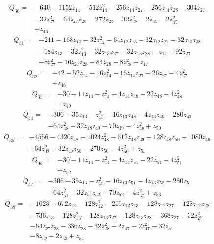 \[\begin{aligned}Q_{30}={}&-640-1152z_{14}-512z_{14}^{2}-256z_{14}z_{27}-256z_{14}z_{28}-304z_{27}
\\&-32z_{27}^{2}-64z_{27}z_{28}-272z_{28}-32z_{28}^{2}-2z_{45}-2z_{45}^{2}
\\&+z_{46}
\end{aligned}\]
\[\begin{aligned}Q_{31}={}&-241-168z_{12}-32z_{12}^{2}-64z_{12}z_{13}-32z_{12}z_{27}-32z_{12}z_{28}
\\&-184z_{13}-32z_{13}^{2}-32z_{13}z_{27}-32z_{13}z_{28}-z_{14}-92z_{27}
\\&-8z_{27}^{2}-16z_{27}z_{28}-84z_{28}-8z_{28}^{2}+z_{47}
\end{aligned}\]
\[\begin{aligned}Q_{32}={}&-42-52z_{14}-16z_{14}^{2}-16z_{14}z_{27}-26z_{27}-4z_{27}^{2}
\\&+z_{48}
\end{aligned}\]
\[\begin{aligned}Q_{33}={}&-30-11z_{14}-z_{14}^{2}-4z_{14}z_{48}-22z_{48}-4z_{48}^{2}
\\&+z_{49}
\end{aligned}\]
\[\begin{aligned}Q_{34}={}&-306-35z_{13}-z_{13}^{2}-16z_{13}z_{48}-4z_{13}z_{49}-280z_{48}
\\&-64z_{48}^{2}-32z_{48}z_{49}-70z_{49}-4z_{49}^{2}+z_{50}
\end{aligned}\]
\[\begin{aligned}Q_{35}={}&-4556-4320z_{48}-1024z_{48}^{2}-512z_{48}z_{49}-128z_{48}z_{50}-1080z_{49}
\\&-64z_{49}^{2}-32z_{49}z_{50}-270z_{50}-4z_{50}^{2}+z_{51}
\end{aligned}\]
\[\begin{aligned}Q_{36}={}&-30-11z_{14}-z_{14}^{2}-4z_{14}z_{51}-22z_{51}-4z_{51}^{2}
\\&+z_{52}
\end{aligned}\]
\[\begin{aligned}Q_{37}={}&-306-35z_{13}-z_{13}^{2}-16z_{13}z_{51}-4z_{13}z_{52}-280z_{51}
\\&-64z_{51}^{2}-32z_{51}z_{52}-70z_{52}-4z_{52}^{2}+z_{53}
\end{aligned}\]
\[\begin{aligned}Q_{38}={}&-1028-672z_{12}-128z_{12}^{2}-256z_{12}z_{13}-128z_{12}z_{27}-128z_{12}z_{28}
\\&-736z_{13}-128z_{13}^{2}-128z_{13}z_{27}-128z_{13}z_{28}-368z_{27}-32z_{27}^{2}
\\&-64z_{27}z_{28}-336z_{28}-32z_{28}^{2}-2z_{47}-2z_{47}^{2}-32z_{51}
\\&-8z_{52}-2z_{53}+z_{54}
\end{aligned}\]
